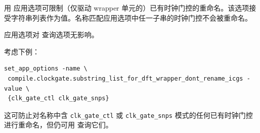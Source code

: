 用  应用选项可限制（仅驱动 wrapper 单元的）已有时钟门控的重命名。该选项接受字符串列表作为值。名称匹配应用选项中任一子串的时钟门控不会被重命名。

\begin{noteBox}
 应用选项对  查询选项无影响。
\end{noteBox}

考虑下例：
\begin{lstlisting}
set_app_options -name \
 compile.clockgate.substring_list_for_dft_wrapper_dont_rename_icgs -value \
 {clk_gate_ctl clk_gate_snps}
\end{lstlisting}

这可防止对名称中含 \texttt{clk\_gate\_ctl} 或 \texttt{clk\_gate\_snps} 模式的任何已有时钟门控进行重命名，但仍可用  查询它们。

